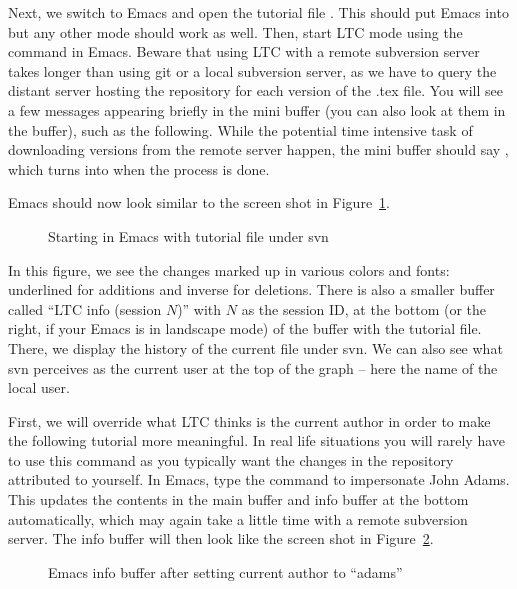Next, we switch to Emacs and open the tutorial file .  This should put Emacs into  but any other mode should work as well.  Then, start LTC mode using the command  in Emacs.  Beware that using LTC with a remote subversion server takes longer than using git or a local subversion server, as we have to query the distant server hosting the repository for each version of the .tex file.  You will see a few messages appearing briefly in the mini buffer (you can also look at them in the  buffer), such as the following.  While the potential time intensive task of downloading versions from the remote server happen, the mini buffer should say , which turns into  when the process is done.
Emacs should now look similar to the screen shot in Figure~\ref{fig:svn-emacs-open}.
\begin{figure}[t]
\centering
{}
\caption{Starting  in Emacs with tutorial file under svn} \label{fig:svn-emacs-open}
\end{figure}
In this figure, we see the changes marked up in various colors and fonts: underlined for additions and inverse for deletions.  There is also a smaller buffer called ``LTC info (session $N$)'' with $N$ as the session ID, at the bottom (or the right, if your Emacs is in landscape mode) of the buffer with the tutorial file.  There, we display the history of the current file under svn.  We can also see what svn perceives as the current user at the top of the graph -- here the name of the local user.

First, we will override what LTC thinks is the current author in order to make the following tutorial more meaningful.  In real life situations you will rarely have to use this command as you typically want the changes in the repository attributed to yourself.  In Emacs, type the command  to impersonate John Adams.  This updates the contents in the main buffer and info buffer at the bottom automatically, which may again take a little time with a remote subversion server.  The info buffer will then look like the screen shot in Figure~\ref{fig:svn-adams}.
\begin{figure}[t]
\centering
{}
\caption{Emacs info buffer after setting current author to ``adams''} \label{fig:svn-adams}
\end{figure}

